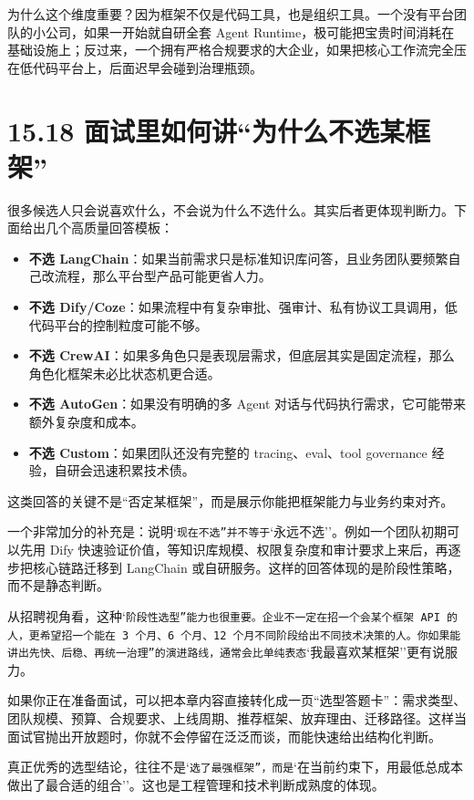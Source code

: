 为什么这个维度重要？因为框架不仅是代码工具，也是组织工具。一个没有平台团队的小公司，如果一开始就自研全套 Agent Runtime，极可能把宝贵时间消耗在基础设施上；反过来，一个拥有严格合规要求的大企业，如果把核心工作流完全压在低代码平台上，后面迟早会碰到治理瓶颈。


\section{15.18 面试里如何讲``为什么不选某框架''}

很多候选人只会说喜欢什么，不会说为什么不选什么。其实后者更体现判断力。下面给出几个高质量回答模板：


\begin{itemize}[leftmargin=2em]
\item \textbf{不选 LangChain}：如果当前需求只是标准知识库问答，且业务团队要频繁自己改流程，那么平台型产品可能更省人力。
\item \textbf{不选 Dify/Coze}：如果流程中有复杂审批、强审计、私有协议工具调用，低代码平台的控制粒度可能不够。
\item \textbf{不选 CrewAI}：如果多角色只是表现层需求，但底层其实是固定流程，那么角色化框架未必比状态机更合适。
\item \textbf{不选 AutoGen}：如果没有明确的多 Agent 对话与代码执行需求，它可能带来额外复杂度和成本。
\item \textbf{不选 Custom}：如果团队还没有完整的 tracing、eval、tool governance 经验，自研会迅速积累技术债。
\end{itemize}

这类回答的关键不是``否定某框架''，而是展示你能把框架能力与业务约束对齐。


一个非常加分的补充是：说明`\texttt{现在不选''并不等于}`永远不选''。例如一个团队初期可以先用 Dify 快速验证价值，等知识库规模、权限复杂度和审计要求上来后，再逐步把核心链路迁移到 LangChain 或自研服务。这样的回答体现的是阶段性策略，而不是静态判断。


从招聘视角看，这种`\texttt{阶段性选型''能力也很重要。企业不一定在招一个会某个框架 API 的人，更希望招一个能在 3 个月、6 个月、12 个月不同阶段给出不同技术决策的人。你如果能讲出}\texttt{先快、后稳、再统一治理''的演进路线，通常会比单纯表态}`我最喜欢某框架''更有说服力。


如果你正在准备面试，可以把本章内容直接转化成一页``选型答题卡''：需求类型、团队规模、预算、合规要求、上线周期、推荐框架、放弃理由、迁移路径。这样当面试官抛出开放题时，你就不会停留在泛泛而谈，而能快速给出结构化判断。


真正优秀的选型结论，往往不是`\texttt{选了最强框架''，而是}`在当前约束下，用最低总成本做出了最合适的组合''。这也是工程管理和技术判断成熟度的体现。


